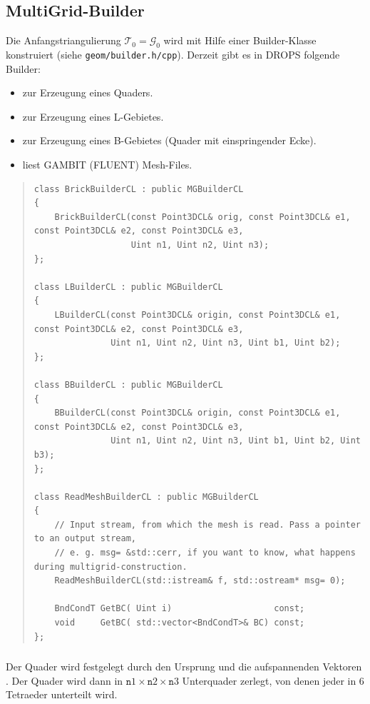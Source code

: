 \documentclass[11pt,a4paper]{article}
\newenvironment{Code}{\begin{quote}\scriptsize}{\end{quote}}
\begin{document}
\subsection{MultiGrid-Builder}
Die Anfangstriangulierung $\mathcal T_0=\mathcal G_0$ wird mit Hilfe einer
Builder-Klasse konstruiert (siehe \verb|geom/builder.h/cpp|). 
Derzeit gibt es in DROPS folgende Builder:
\begin{itemize}
    \item {} zur Erzeugung eines Quaders.
    \item {} zur Erzeugung eines L-Gebietes.
    \item {} zur Erzeugung eines B-Gebietes (Quader mit
    einspringender Ecke).
    \item {} liest GAMBIT (FLUENT) Mesh-Files.
\end{itemize}

\begin{Code}
\begin{verbatim}
class BrickBuilderCL : public MGBuilderCL
{
    BrickBuilderCL(const Point3DCL& orig, const Point3DCL& e1, const Point3DCL& e2, const Point3DCL& e3, 
                   Uint n1, Uint n2, Uint n3);
};

class LBuilderCL : public MGBuilderCL
{
    LBuilderCL(const Point3DCL& origin, const Point3DCL& e1, const Point3DCL& e2, const Point3DCL& e3,
               Uint n1, Uint n2, Uint n3, Uint b1, Uint b2);
};

class BBuilderCL : public MGBuilderCL
{
    BBuilderCL(const Point3DCL& origin, const Point3DCL& e1, const Point3DCL& e2, const Point3DCL& e3,
               Uint n1, Uint n2, Uint n3, Uint b1, Uint b2, Uint b3);
};

class ReadMeshBuilderCL : public MGBuilderCL
{
    // Input stream, from which the mesh is read. Pass a pointer to an output stream,
    // e. g. msg= &std::cerr, if you want to know, what happens during multigrid-construction.
    ReadMeshBuilderCL(std::istream& f, std::ostream* msg= 0);

    BndCondT GetBC( Uint i)                    const;
    void     GetBC( std::vector<BndCondT>& BC) const;
};
\end{verbatim}
\end{Code}

\subsubsection{}
Der Quader wird festgelegt durch den Ursprung 
und die aufspannenden Vektoren . Der Quader wird dann in
${\mathtt n1}\times{\mathtt n2}\times{\mathtt n3}$ Unterquader zerlegt, von
denen jeder in 6 Tetraeder unterteilt wird.
\end{document}
